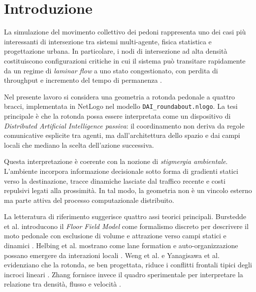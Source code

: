 \section{Introduzione}
La simulazione del movimento collettivo dei pedoni rappresenta uno dei casi più interessanti di intersezione tra sistemi multi-agente, fisica statistica e progettazione urbana. In particolare, i nodi di intersezione ad alta densità costituiscono configurazioni critiche in cui il sistema può transitare rapidamente da un regime di \textit{laminar flow} a uno stato congestionato, con perdita di throughput e incremento del tempo di permanenza \cite{zhang2012}.

Nel presente lavoro si considera una geometria a rotonda pedonale a quattro bracci, implementata in NetLogo nel modello \texttt{DAI\_roundabout.nlogo}. La tesi principale è che la rotonda possa essere interpretata come un dispositivo di \textit{Distributed Artificial Intelligence passiva}: il coordinamento non deriva da regole comunicative esplicite tra agenti, ma dall'architettura dello spazio e dai campi locali che mediano la scelta dell'azione successiva.

Questa interpretazione è coerente con la nozione di \textit{stigmergia ambientale}. L'ambiente incorpora informazione decisionale sotto forma di gradienti statici verso la destinazione, tracce dinamiche lasciate dal traffico recente e costi repulsivi legati alla prossimità. In tal modo, la geometria non è un vincolo esterno ma parte attiva del processo computazionale distribuito.

La letteratura di riferimento suggerisce quattro assi teorici principali. Burstedde et al. introducono il \textit{Floor Field Model} come formalismo discreto per descrivere il moto pedonale con esclusione di volume e attrazione verso campi statici e dinamici \cite{burstedde2001}. Helbing et al. mostrano come lane formation e auto-organizzazione possano emergere da interazioni locali \cite{helbing2005}. Weng et al. e Yanagisawa et al. evidenziano che la rotonda, se ben progettata, riduce i conflitti frontali tipici degli incroci lineari \cite{weng2006,yanagisawa2019}. Zhang fornisce invece il quadro sperimentale per interpretare la relazione tra densità, flusso e velocità \cite{zhang2012}.
